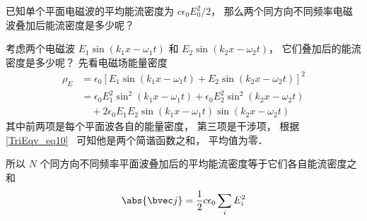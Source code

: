

已知单个平面电磁波的平均能流密度为 $c\epsilon_0 E_0^2/2$， 那么两个同方向不同频率电磁波叠加后能流密度是多少呢？

考虑两个电磁波 $E_1 \sin(k_1 x - \omega_1 t)$ 和 $E_2 \sin(k_2x - \omega_2 t)$， 它们叠加后的能流密度是多少呢？ 先看电磁场能量密度
\begin{equation}
\begin{aligned}
\rho_E &= \epsilon_0 [E_1 \sin(k_1 x - \omega_1 t) + E_2 \sin(k_2x - \omega_2 t)]^2\\
&= \epsilon_0 E_1^2 \sin^2(k_1 x - \omega_1 t) + \epsilon_0 E_2^2 \sin^2(k_2x - \omega_2 t)\\
&\quad  + 2\epsilon_0 E_1 E_2 \sin(k_1 x - \omega_1 t) \sin(k_2x - \omega_2 t)
\end{aligned}
\end{equation}
其中前两项是每个平面波各自的能量密度， 第三项是干涉项， 根据\autoref{TriEqv_eq10}~ 可知他是两个简谐函数之和， 平均值为零．

所以 $N$ 个同方向不同频率平面波叠加后的平均能流密度等于它们各自能流密度之和
\begin{equation}
\abs{\bvec j} = \frac{1}{2}c\epsilon_0 \sum_i E_i^2
\end{equation}
